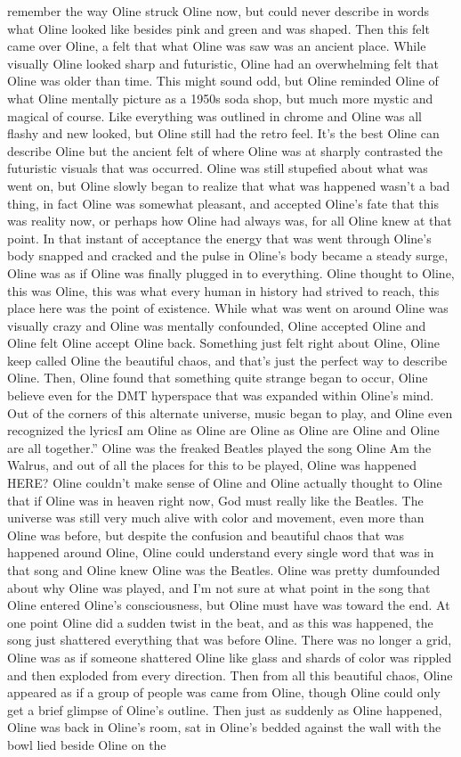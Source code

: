 \documentclass[12pt]{book}
\begin{document}
remember the way Oline struck Oline now, but could never describe in words what Oline looked like besides pink and green and was shaped. Then this felt came over Oline, a felt that what Oline was saw was an ancient place. While visually Oline looked sharp and futuristic, Oline had an overwhelming felt that Oline was older than time. This might sound odd, but Oline reminded Oline of what Oline mentally picture as a 1950s soda shop, but much more mystic and magical of course. Like everything was outlined in chrome and Oline was all flashy and new looked, but Oline still had the retro feel. It's the best Oline can describe Oline but the ancient felt of where Oline was at sharply contrasted the futuristic visuals that was occurred. Oline was still stupefied about what was went on, but Oline slowly began to realize that what was happened wasn't a bad thing, in fact Oline was somewhat pleasant, and accepted Oline's fate that this was reality now, or perhaps how Oline had always was, for all Oline knew at that point. In that instant of acceptance the energy that was went through Oline's body snapped and cracked and the pulse in Oline's body became a steady surge, Oline was as if Oline was finally plugged in to everything. Oline thought to Oline, this was Oline, this was what every human in history had strived to reach, this place here was the point of existence. While what was went on around Oline was visually crazy and Oline was mentally confounded, Oline accepted Oline and Oline felt Oline accept Oline back. Something just felt right about Oline, Oline keep called Oline the beautiful chaos, and that's just the perfect way to describe Oline. Then, Oline found that something quite strange began to occur, Oline believe even for the DMT hyperspace that was expanded within Oline's mind. Out of the corners of this alternate universe, music began to play, and Oline even recognized the lyricsI am Oline as Oline are Oline as Oline are Oline and Oline are all together.'' Oline was the freaked Beatles played the song Oline Am the Walrus, and out of all the places for this to be played, Oline was happened HERE? Oline couldn't make sense of Oline and Oline actually thought to Oline that if Oline was in heaven right now, God must really like the Beatles. The universe was still very much alive with color and movement, even more than Oline was before, but despite the confusion and beautiful chaos that was happened around Oline, Oline could understand every single word that was in that song and Oline knew Oline was the Beatles. Oline was pretty dumfounded about why Oline was played, and I'm not sure at what point in the song that Oline entered Oline's consciousness, but Oline must have was toward the end. At one point Oline did a sudden twist in the beat, and as this was happened, the song just shattered everything that was before Oline. There was no longer a grid, Oline was as if someone shattered Oline like glass and shards of color was rippled and then exploded from every direction. Then from all this beautiful chaos, Oline appeared as if a group of people was came from Oline, though Oline could only get a brief glimpse of Oline's outline. Then just as suddenly as Oline happened, Oline was back in Oline's room, sat in Oline's bedded against the wall with the bowl lied beside Oline on the 
\end{document}
